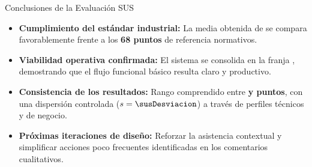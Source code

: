 \documentclass[10pt,aspectratio=169]{beamer}
\begin{document}
\begin{frame}{Conclusiones de la Evaluación SUS}
  \begin{itemize}
    \setlength{\itemsep}{10pt}
    \item \textbf{Cumplimiento del estándar industrial:}
      La media obtenida de \textbf{\susMedia} se compara favorablemente frente a los \textbf{68 puntos} de referencia normativos.
    \item \textbf{Viabilidad operativa confirmada:}
      El sistema se consolida en la franja \textbf{\susAceptabilidadMedia}, demostrando que el flujo funcional básico resulta claro y productivo.
    \item \textbf{Consistencia de los resultados:}
      Rango comprendido entre \textbf{\susMinimo{} y \susMaximo{} puntos}, con una dispersión controlada ($s = \susDesviacion$) a través de perfiles técnicos y de negocio.
    \item \textbf{Próximas iteraciones de diseño:}
      Reforzar la asistencia contextual y simplificar acciones poco frecuentes identificadas en los comentarios cualitativos.
  \end{itemize}
\end{frame}
\end{document}

